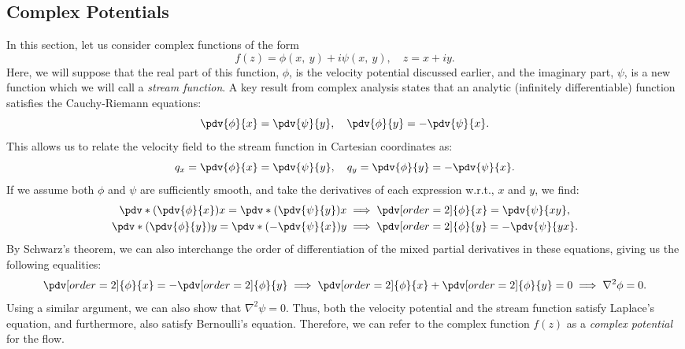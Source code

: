 \documentclass{article}
\theoremstyle{definition}
\begin{document}
\subsection{Complex Potentials}
In this section, let us consider complex functions of the form
\begin{equation*}
    f\left( z \right) = \phi\left( x,\: y \right) + i \psi\left( x,\: y \right), \quad z = x + iy.
\end{equation*}
Here, we will suppose that the real part of this function, \(\phi\), is
the velocity potential discussed earlier, and the imaginary part,
\(\psi\), is a new function which we will call a \textit{stream
    function}. A key result from complex analysis states that
an analytic (infinitely differentiable) function satisfies the
Cauchy-Riemann equations:
\begin{equation*}
    \pdv{\phi}{x} = \pdv{\psi}{y}, \quad \pdv{\phi}{y} = -\pdv{\psi}{x}.
\end{equation*}
This allows us to relate the velocity field to the stream function in
Cartesian coordinates as:
\begin{equation*}
    q_x = \pdv{\phi}{x} = \pdv{\psi}{y}, \quad q_y = \pdv{\phi}{y} = -\pdv{\psi}{x}.
\end{equation*}
If we assume both \(\phi\) and \(\psi\) are sufficiently smooth, and
take the derivatives of each expression w.r.t., \(x\) and \(y\), we find:
\begin{align*}
    \pdv*{\left( \pdv{\phi}{x} \right)}{x} = \pdv*{\left( \pdv{\psi}{y} \right)}{x}  & \implies \pdv[order=2]{\phi}{x} = \pdv{\psi}{xy},  \\
    \pdv*{\left( \pdv{\phi}{y} \right)}{y} = \pdv*{\left( -\pdv{\psi}{x} \right)}{y} & \implies \pdv[order=2]{\phi}{y} = -\pdv{\psi}{yx}.
\end{align*}
By Schwarz's theorem, we can also interchange the order of
differentiation of the mixed partial derivatives in these equations,
giving us the following equalities:
\begin{equation*}
    \pdv[order=2]{\phi}{x} = - \pdv[order=2]{\phi}{y} \implies \pdv[order=2]{\phi}{x} + \pdv[order=2]{\phi}{y} = 0 \implies \nabla^2 \phi = 0.
\end{equation*}
Using a similar argument, we can also show that \(\nabla^2 \psi = 0\).
Thus, both the velocity potential and the stream function satisfy
Laplace's equation, and furthermore, also satisfy Bernoulli's equation.
Therefore, we can refer to the complex function \(f\left( z \right)\)
as a \textit{complex potential} for the flow.
\end{document}
